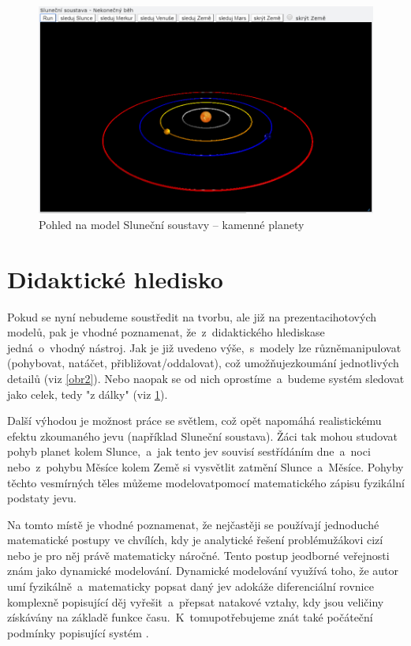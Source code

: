 \documentclass[FM,BP]{tulthesis}
\begin{document}
\begin{figure}[ht]
\centering
\includegraphics[width=\textwidth]{img3.png}
\caption{Pohled na model Sluneční soustavy – kamenné planety}
\label{obr3}
\end{figure}
\section{Didaktické hledisko}
Pokud se nyní nebudeme soustředit na tvorbu, ale již na prezentacihotových modelů, pak je vhodné poznamenat, že~z~didaktického hlediskase jedná~o~vhodný nástroj. Jak je již uvedeno výše,~s~modely lze různěmanipulovat (pohybovat, natáčet, přibližovat/oddalovat), což umožňujezkoumání jednotlivých detailů (viz \ref{obr2}). Nebo naopak se od nich oprostíme~a~budeme systém sledovat jako celek, tedy "z dálky" (viz \ref{obr3}).

Další výhodou je možnost práce se světlem, což opět napomáhá realistickému efektu zkoumaného jevu (například Sluneční soustava). Žáci tak mohou studovat pohyb planet kolem Slunce,~a~jak tento jev souvisí sestřídáním dne~a~noci nebo~z~pohybu Měsíce kolem Země si vysvětlit zatmění Slunce~a~Měsíce. Pohyby těchto vesmírných těles můžeme modelovatpomocí matematického zápisu fyzikální podstaty jevu.

Na tomto místě je vhodné poznamenat, že nejčastěji se používají jednoduché matematické postupy ve chvílích, kdy je analytické řešení problémužákovi cizí nebo je pro něj právě matematicky náročné. Tento postup jeodborné veřejnosti znám jako dynamické modelování. Dynamické modelování využívá toho, že autor umí fyzikálně~a~matematicky popsat daný jev adokáže diferenciální rovnice komplexně popisující děj vyřešit~a~přepsat natakové vztahy, kdy jsou veličiny získávány na základě funkce času.~K~tomupotřebujeme znát také počáteční podmínky popisující systém \cite{c:3,c:7,c:8,c:9}.
\end{document}
